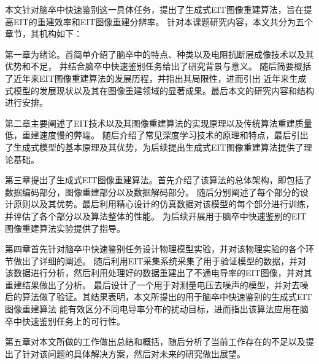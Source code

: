 
本文针对脑卒中快速鉴别这一具体任务，提出了生成式EIT图像重建算法，旨在提高EIT的重建效率和EIT图像重建分辨率。
针对本课题研究内容，本文共分为五个章节，其机构如下：

第一章为绪论。首简单介绍了脑卒中的特点、种类以及电阻抗断层成像技术以及其优势和不足，
并结合脑卒中快速鉴别任务给出了研究背景与意义。 随后简要概括了近年来EIT图像重建算法的发展历程，并指出其局限性，进而引出
近年来生成式模型的发展现状以及其在图像重建领域的显著成果。最后本文的研究内容和结构进行安排。

第二章主要阐述了EIT技术以及其图像重建算法的实现原理以及传统算法重建质量低，重建速度慢的弊端。
随后介绍了常见深度学习技术的原理和特点，最后引出了生成式模型的基本原理及其优势，为后续提出生成式EIT图像重建算法提供了理论基础。

第三章提出了生成式EIT图像重建算法。首先介绍了该算法的总体架构，即包括了数据编码部分，图像重建部分以及数据解码部分。
随后分别阐述了每个部分的设计原则以及其优势。最后利用精心设计的仿真数据对该模型的每个部分进行训练，并评估了各个部分以及算法整体的性能。
为后续开展用于脑卒中快速鉴别的EIT图像重建算法实验提供了指导。

第四章首先针对脑卒中快速鉴别任务设计物理模型实验，并对该物理实验的各个环节做出了详细的阐述。
随后利用EIT采集系统采集了用于验证模型的数据，并对该数据进行分析，然后利用处理好的数据重建出了不通电导率的EIT图像，并对其重建结果做出了分析。
最后设计了一个用于对测量电压去噪声的模型，并对去噪后的算法做了验证。其结果表明，本文所提出的用于脑卒中快速鉴别的生成式EIT图像重建算法
能有效区分不同电导率分布的扰动目标，进而指出该算法应用在脑卒中快速鉴别任务上的可行性。

第五章对本文所做的工作做出总结和概括，随后分析了当前工作存在的不足以及提出了针对该问题的具体解决方案，然后对未来的研究做出展望。
